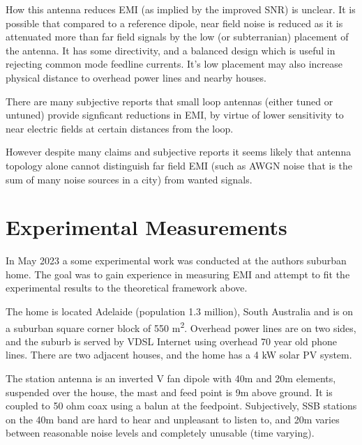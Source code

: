 \documentclass{article}
\begin{document}
How this antenna reduces EMI (as implied by the improved SNR) is unclear. It is possible that compared to a reference dipole, near field noise is reduced as it is attenuated more than far field signals by the low (or subterranian) placement of the antenna.  It has some directivity, and a balanced design which is useful in rejecting common mode feedline currents.  It's low placement may also increase physical distance to overhead power lines and nearby houses. 

There are many subjective reports that small loop antennas (either tuned or untuned) provide signficant reductions in EMI, by virtue of lower sensitivity to near electric fields at certain distances from the loop.

However despite many claims and subjective reports it seems likely that antenna topology alone cannot distinguish far field EMI (such as AWGN noise that is the sum of many noise sources in a city) from wanted signals.

\section{Experimental Measurements}

In May 2023 a some experimental work was conducted at the authors suburban home.  The goal was to gain experience in measuring EMI and attempt to fit the experimental results to the theoretical framework above.

The home is located Adelaide (population 1.3 million), South Australia and is on a suburban square corner block of 550 \si{\metre\squared}.  Overhead power lines are on two sides, and the suburb is served by VDSL Internet using overhead 70 year old phone lines.  There are two adjacent houses, and the home has a 4 kW solar PV system.

The station antenna is an inverted V fan dipole with 40m and 20m elements, suspended over the house, the mast and feed point is 9m above ground. It is coupled to 50 ohm coax using a balun at the feedpoint. Subjectively, SSB stations on the 40m band are hard to hear and unpleasant to listen to, and 20m varies between reasonable noise levels and completely unusable (time varying).
\end{document}
